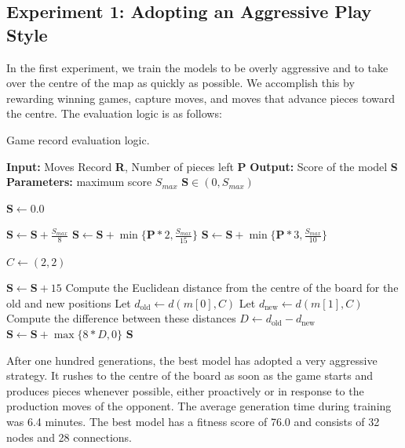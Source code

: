 \documentclass[letterpaper, 12pt]{article}
\begin{document}
\subsection{Experiment 1: Adopting an Aggressive Play Style}
In the first experiment, we train the models to be overly aggressive and to take over
the centre of the map as quickly as possible. We accomplish this by rewarding winning
games, capture moves, and moves that advance pieces toward the centre. The evaluation
logic is as follows:

\begin{algorithm}[H]
\caption{Game record evaluation logic.}
\begin{algorithmic}[0]
  \State \textbf{Input:} Moves Record \textbf{R}, Number of pieces left \textbf{P}
  \State \textbf{Output:} Score of the model \textbf{S}
  \State \textbf{Parameters:} maximum score $S_{max}$
  \Ensure $\textbf{S} \in (0, S_{max})$

  \State $\textbf{S} \gets 0.0$ 

  \State $\textbf{S} \gets \textbf{S} + \frac{S_{max}}{8}$
  \State $\textbf{S} \gets \textbf{S} + \min \{\textbf{P} * 2, \frac{S_{max}}{15}\}$
  \State $\textbf{S} \gets \textbf{S} + \min \{\textbf{P} * 3, \frac{S_{max}}{10}\}$
  \EndIf
  
  \State $C \gets (2, 2)$ 

      \State $\textbf{S} \gets \textbf{S} + 15$
      \State Compute the Euclidean distance from the centre
      \State of the board for the old and new positions
      \State Let $d_{\text{old}} \gets d(m[0], C)$ 
      \State Let $d_{\text{new}} \gets d(m[1], C)$ 
      \State Compute the difference between these distances
      \State $D \gets d_{\text{old}} - d_{\text{new}}$
      \State $\textbf{S} \gets \textbf{S} + \max \{8 * D, 0\}$
    \EndIf
  \EndFor
  \State \Return \textbf{S}
\end{algorithmic}
\end{algorithm}

After one hundred generations, the best model has adopted a very aggressive strategy. It
rushes to the centre of the board as soon as the game starts and produces pieces
whenever possible, either proactively or in response to the production moves of the
opponent. The average generation time during training was 6.4 minutes. The best model
has a fitness score of 76.0 and consists of 32 nodes and 28 connections.
\end{document}
